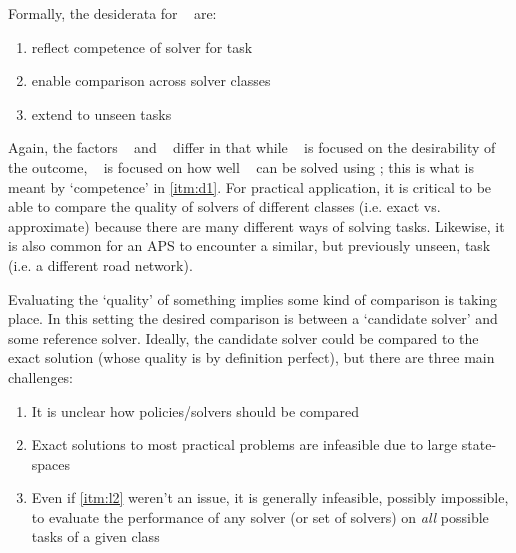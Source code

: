     Formally, the desiderata for \xQ~ are:
    
    \begin{enumerate}[label=\textbf{D\arabic*}]
        \item reflect competence of solver \solve{} for task \task{} \label{itm:d1}
        \item enable comparison across solver classes \label{itm:d2}
        \item extend to unseen tasks \label{itm:d3}
    \end{enumerate}
    
    Again, the factors \xO~ and \xQ~ differ in that while \xO~ is focused on the desirability of the outcome, \xQ~ is focused on how well \task~ can be solved using \solve; this is what is meant by `competence' in \ref{itm:d1}. For practical application, it is critical to be able to compare the quality of solvers of different classes (i.e. exact vs. approximate) because there are many different ways of solving tasks. Likewise, it is also common for an APS to encounter a similar, but previously unseen, task (i.e. a different road network).
    
    Evaluating the `quality' of something implies some kind of comparison is taking place. In this setting the desired comparison is between a `candidate solver' \solve{} and some reference solver. Ideally, the candidate solver could be compared to the exact solution (whose quality is by definition perfect), but there are three main challenges:

    \begin{enumerate}[label=\textbf{C\arabic*}]
        \item It is unclear how policies/solvers should be compared \label{itm:l1}
        \item Exact solutions to most practical problems are infeasible due to large state-spaces \label{itm:l2}
        \item Even if \ref{itm:l2} weren't an issue, it is generally infeasible, possibly impossible, to evaluate the performance of any solver (or set of solvers) on \emph{all} possible tasks \label{itm:l3} of a given class
    \end{enumerate}

